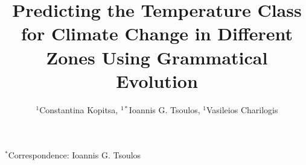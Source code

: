 \documentclass[12pt]{Definitions/academia}
\begin{document}





\title{Predicting the Temperature Class for Climate Change in Different Zones
Using Grammatical Evolution}


\author{$^{1}$Constantina Kopitsa, $^{1*}$Ioannis G. Tsoulos, $^{1}$Vasileios Charilogis}

\maketitle


\noindent $^{*}$Correspondence:  Ioannis G. Tsoulos
\end{document}
